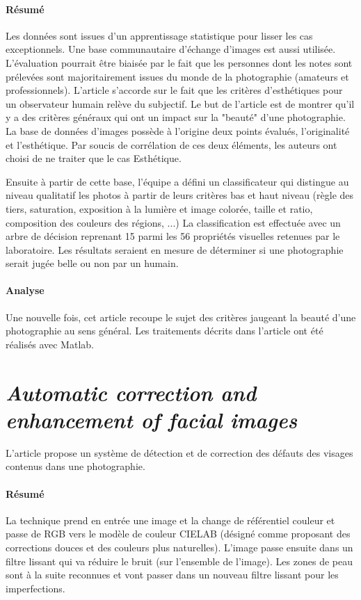 \documentclass[11pt, french]{report-rd-info}
\begin{document}
\paragraph{Résumé}
Les données sont issues d'un apprentissage statistique pour lisser les cas exceptionnels. Une base communautaire d'échange d'images est aussi utilisée. L'évaluation pourrait être biaisée par le fait que les personnes dont les notes sont prélevées sont majoritairement issues du monde de la photographie (amateurs et professionnels). L'article s'accorde sur le fait que les critères d'esthétiques pour un observateur humain relève du subjectif. Le but de l'article est de montrer qu'il y a des critères généraux qui ont un impact sur la "beauté" d'une photographie. La base de données d'images possède à l'origine deux points évalués, l'originalité et l'esthétique. Par soucis de corrélation de ces deux éléments, les auteurs ont choisi de ne traiter que le cas Esthétique.

Ensuite à partir de cette base, l'équipe a défini un classificateur qui distingue au niveau qualitatif les photos à partir de leurs critères bas et haut niveau (règle des tiers, saturation, exposition à la lumière et image colorée, taille et ratio, composition des couleurs des régions, ...)
La classification est effectuée avec un arbre de décision reprenant 15 parmi les 56 propriétés visuelles retenues par le laboratoire. Les résultats seraient en mesure de déterminer si une photographie serait jugée belle ou non par un humain.

\paragraph{Analyse}
Une nouvelle fois, cet article recoupe le sujet des critères jaugeant la beauté d'une photographie au sens général. Les traitements décrits dans l’article ont été réalisés avec Matlab.

\section{\emph{Automatic correction and enhancement of facial images}}
L'article \cite{Konoplev2012} propose un système de détection et de correction des défauts des visages contenus dans une photographie.

\paragraph{Résumé}
La technique prend en entrée une image et la change de référentiel couleur et passe de RGB vers le modèle de couleur CIELAB (désigné comme proposant des corrections douces et des couleurs plus naturelles). L'image passe ensuite dans un filtre lissant qui va réduire le bruit (sur l’ensemble de l’image). Les zones de peau sont à la suite reconnues et vont passer dans un nouveau filtre lissant pour les imperfections. 
\end{document}
